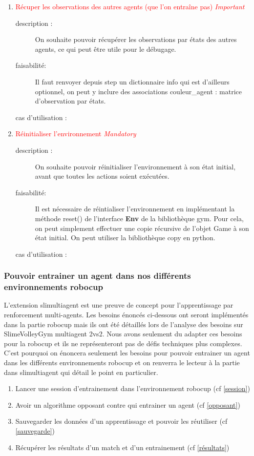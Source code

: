 \documentclass[11pt, a4paper]{article}
\newcommand{\besoinVItem}[4]{
	\item #1
	\begin{description}
		\item[description :]
		#2
		\item[faisabilité: ]
		#3
		\item[cas d'utilisation :]
		#4
	\end{description}
}
\begin{document}
\begin{enumerate}
\begin{enumerate}
			\besoinVItem{\textcolor{red}{Récuper les observations des autres agents (que l'on entraîne pas) \textit{Important}}
			}
			{On souhaite pouvoir récupérer les observations par états des autres agents, ce qui peut être utile pour le débugage.
			}
			{Il faut renvoyer depuis step un dictionnaire info qui est d'ailleurs optionnel, on peut y inclure des associations {couleur\_agent : matrice d'observation par états}.
			}
			{}

			\besoinVItem{\textcolor{red}{Réinitialiser l'environnement \textit{Mandatory}}
			}
			{On souhaite pouvoir réinitialiser l'environnement à son état initial, avant que toutes les actions soient exécutées.
			}
			{Il est nécessaire de réintialiser l'environnement en implémentant la méthode reset() de l'interface \textbf{Env} de la bibliothèque gym.
			Pour cela, on peut simplement effectuer une copie récursive de l'objet Game à son état initial. On peut utiliser la bibliothèque copy en python.
			}
			{}

		\end{enumerate}

	\end{enumerate}

	\subsubsection{Pouvoir entrainer un agent dans nos différents environnements robocup}
	L'extension slimultiagent est une preuve de concept pour l'apprentissage par renforcement multi-agents. Les besoins énoncés ci-dessous ont seront implémentés dans la partie robocup mais ils ont été détaillés lors de l'analyse des besoins sur SlimeVolleyGym multiagent 2vs2. Nous avons seulement du adapter ces besoins pour la robocup et ils ne représenteront pas de défis techniques plus complexes. C'est pourquoi on énoncera seulement les besoins pour pouvoir entrainer un agent dans les différents environnements robocup et on renverra le lecteur à la partie dans slimultiagent qui détail le point en particulier.
	\begin{enumerate}
		\item Lancer une session d'entrainement dans l'environnement robocup (cf \ref{session})
		\item Avoir un algorithme opposant contre qui entrainer un agent (cf \ref{opposant})
		\item Sauvegarder les données d'un apprentissage  et pouvoir les réutiliser (cf \ref{sauvegarde})
		\item Récupérer les résultats d'un match et d'un entrainement (cf \ref{résultats})
	\end{enumerate}
\end{document}
